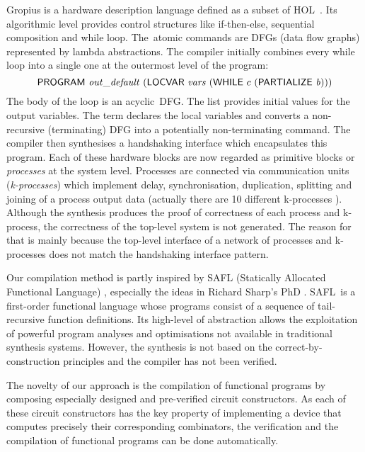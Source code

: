 Gropius is a hardware description language
defined as a subset of HOL~\mbox{\cite{Blu01,Gropius1}}.
Its algorithmic level
provides control structures like if-then-else,
sequential composition and while loop.
The~atomic commands are DFGs (data flow
graphs) represented by lambda abstractions.
The compiler initially combines every while loop into
a single one at the outermost level of the
program:
\[
\DEF{PROGRAM}\ \VAR{out\_default}\ (\DEF{LOCVAR}\ \VAR{vars}\ 
(\DEF{WHILE}\ c\ (\DEF{PARTIALIZE}\ \VAR{b})))
\]
The body  of the  loop is an acyclic~DFG.
The list 
provides initial values for the output variables.
The term  declares the local variables
 and  converts a
non-recursive (terminating) DFG into a potentially
non-terminating command.
The compiler then synthesises a handshaking
interface which encapsulates this program.
Each of these hardware blocks are now regarded
as primitive blocks or {\em processes\/} at the system level.
Processes are connected via communication
units ({\em k-processes\/}) which implement delay,
synchronisation, duplication,
splitting and joining of a process output data
(actually there  are 10 different k-processes \cite{Blu01}).
Although the synthesis produces the proof of
correctness of each process and k-process,
the correctness of the top-level system is not generated.
The reason for that is mainly because
the top-level interface of a network of processes and 
k-processes does not match the handshaking interface pattern.

Our compilation method is partly inspired by SAFL 
(Statically Allocated Functional Language) \cite{MS01b},
especially the ideas in Richard Sharp's PhD \cite{Sha02}. 
SAFL~is a first-order functional language whose
programs consist of a sequence of tail-recursive function 
definitions. Its high-level of abstraction allows
the exploitation of powerful program analyses
and optimisations not available in traditional
synthesis systems. 
However, the synthesis is not based on
the correct-by-construction principles
and the compiler has not been verified.

The novelty of our approach is the 
compilation of functional programs by
composing especially designed and
pre-verified circuit constructors.
%
As each of these circuit constructors
has the key property of implementing
a device that computes precisely their
corresponding combinators, 
the verification and the compilation of 
functional programs can be done
automatically.
